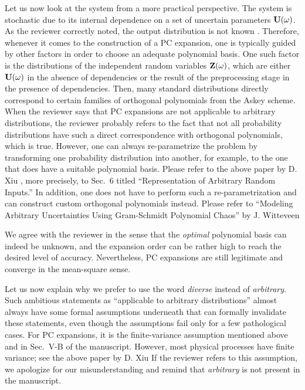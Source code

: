 \begin{authors}
Let us now look at the system from a more practical perspective.
The system is stochastic due to its internal dependence on a set of uncertain parameters $\mathbf{U}(\omega)$.
As the reviewer correctly noted, the output distribution is not known \apriori.
Therefore, whenever it comes to the construction of a PC expansion, one is typically guided by other factors in order to choose an adequate polynomial basis.
One such factor is the distributions of the independent random variables $\mathbf{Z}(\omega)$, which are either $\mathbf{U}(\omega)$ in the absence of dependencies or the result of the preprocessing stage in the presence of dependencies.
Then, many standard distributions directly correspond to certain families of orthogonal polynomials from the Askey scheme.
When the reviewer says that PC expansions are not applicable to arbitrary distributions, the reviewer probably refers to the fact that not all probability distributions have such a direct correspondence with orthogonal polynomials, which is true.
However, one can always re-parametrize the problem by transforming one probability distribution into another, for example, to the one that does have a suitable polynomial basis.
Please refer to the above paper by D. Xiu \etal, more precisely, to Sec.~6 titled ``Representation of Arbitrary Random Inputs.''
In addition, one does not have to perform such a re-parametrization and can construct custom orthogonal polynomials instead.
Please refer to ``Modeling Arbitrary Uncertainties Using Gram-Schmidt Polynomial Chaos'' by J. Witteveen \etal

We agree with the reviewer in the sense that the \emph{optimal} polynomial basis can indeed be unknown, and the expansion order can be rather high to reach the desired level of accuracy.
Nevertheless, PC expansions are still legitimate and converge in the mean-square sense.

Let us now explain why we prefer to use the word \emph{diverse} instead of \emph{arbitrary}.
Such ambitious statements as ``applicable to arbitrary distributions'' almost always have some formal assumptions underneath that can formally invalidate these statements, even though the assumptions fail only for a few pathological cases.
For PC expansions, it is the finite-variance assumption mentioned above and in Sec.~V-B of the manuscript.
However, most physical processes have finite variance; see the above paper by D. Xiu \etal{}
If the reviewer refers to this assumption, we apologize for our misunderstanding and remind that \emph{arbitrary} is not present in the manuscript.

\begin{actions}
\end{actions}
\end{authors}

